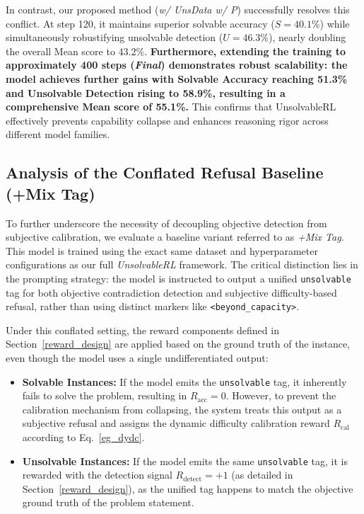 In contrast, our proposed method (\textit{w/ UnsData w/ P}) successfully resolves this conflict. At step 120, it maintains superior solvable accuracy ($S=40.1\%$) while simultaneously robustifying unsolvable detection ($U=46.3\%$), nearly doubling the overall Mean score to 43.2\%. \textbf{Furthermore, extending the training to approximately 400 steps (\textit{Final}) demonstrates robust scalability: the model achieves further gains with Solvable Accuracy reaching 51.3\% and Unsolvable Detection rising to 58.9\%, resulting in a comprehensive Mean score of 55.1\%.} This confirms that UnsolvableRL effectively prevents capability collapse and enhances reasoning rigor across different model families.

\subsection{Analysis of the Conflated Refusal Baseline (+Mix Tag)} \label{sec:mix_tag_analysis}

To further underscore the necessity of decoupling objective detection from subjective calibration, we evaluate a baseline variant referred to as \textit{+Mix Tag}. This model is trained using the exact same dataset and hyperparameter configurations as our full \textit{UnsolvableRL} framework. The critical distinction lies in the prompting strategy: the model is instructed to output a unified \texttt{unsolvable} tag for both objective contradiction detection and subjective difficulty-based refusal, rather than using distinct markers like \texttt{<beyond\_capacity>}.

Under this conflated setting, the reward components defined in Section~\ref{reward_design} are applied based on the ground truth of the instance, even though the model uses a single undifferentiated output:

\begin{itemize}
    \item \textbf{Solvable Instances:} If the model emits the \texttt{unsolvable} tag, it inherently fails to solve the problem, resulting in $R_{\text{acc}} = 0$. However, to prevent the calibration mechanism from collapsing, the system treats this output as a subjective refusal and assigns the dynamic difficulty calibration reward $R_{\text{cal}}$ according to Eq.~\ref{eg_dydc}.
    \item \textbf{Unsolvable Instances:} If the model emits the same \texttt{unsolvable} tag, it is rewarded with the detection signal $R_{\text{detect}} = +1$ (as detailed in Section~\ref{reward_design}), as the unified tag happens to match the objective ground truth of the problem statement.
\end{itemize}

